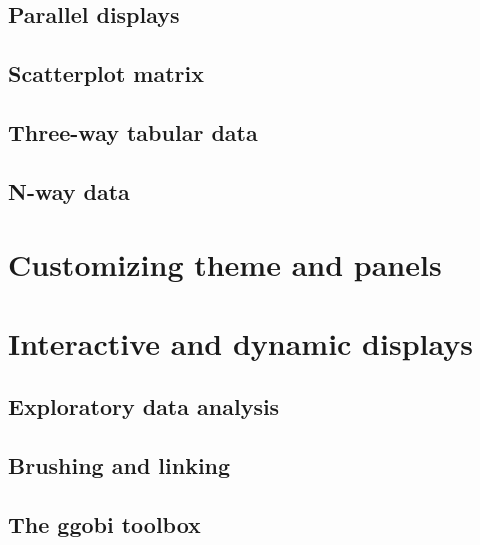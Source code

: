 \documentclass[a4paper,twoside]{book}
\begin{document}
\section{Parallel displays}

\section{Scatterplot matrix}

\section{Three-way tabular data}

\section{N-way data}

\chapter{Customizing theme and panels}


\chapter{Interactive and dynamic displays}

\section{Exploratory data analysis}

\section{Brushing and linking}

\section{The ggobi toolbox}


\appendix
\backmatter

\printindex
\end{document}
